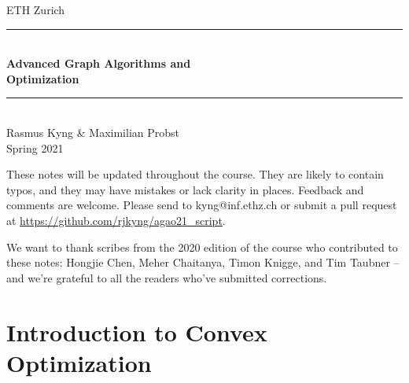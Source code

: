 \documentclass[12pt,a4paper,openany]{book}
\begin{document}
%
%
\begin{titlepage}

\newcommand{\HRule}{\rule{\linewidth}{0.5mm}} %
{\center

{\Large ETH Zurich}\\[1.5cm]
\HRule \\[0.4cm]
{ \huge \bfseries Advanced Graph Algorithms and \\ Optimization}\\[0.4cm] %
\HRule \\[1.5cm]

{\LARGE Rasmus Kyng \& Maximilian Probst}\\[2cm]


{\Large Spring 2021}\\[2cm] %

}
\vfill




\end{titlepage}

These notes will be updated throughout the course.
They are likely to contain typos, and they may have mistakes or
lack clarity in places. Feedback and comments are 
welcome. Please send to kyng@inf.ethz.ch or submit a pull request at
\url{https://github.com/rjkyng/agao21_script}.

We want to thank scribes from the 2020 edition of the course who
contributed to these notes: Hongjie
Chen, Meher Chaitanya, Timon Knigge, and Tim Taubner -- and we're
grateful to all the readers who've submitted corrections.

\newpage

\tableofcontents





\label{part:intro}


\part{Introduction to Convex Optimization}
\label{part:convex}



% 
% 
\end{document}
